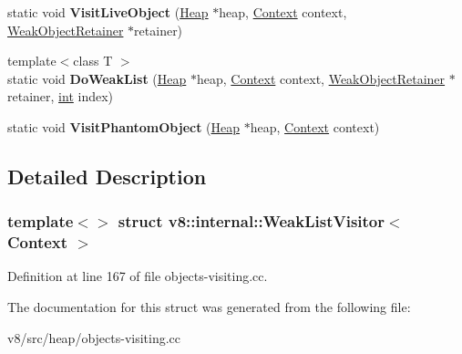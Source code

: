 \begin{DoxyCompactItemize}
static void {\bfseries Visit\+Live\+Object} (\mbox{\hyperlink{classv8_1_1internal_1_1Heap}{Heap}} $\ast$heap, \mbox{\hyperlink{classv8_1_1internal_1_1Context}{Context}} context, \mbox{\hyperlink{classv8_1_1internal_1_1WeakObjectRetainer}{Weak\+Object\+Retainer}} $\ast$retainer)
\item 
\mbox{\label{structv8_1_1internal_1_1WeakListVisitor_3_01Context_01_4_a033eff15f38049f2b457f5242b48932e}} 
{\footnotesize template$<$class T $>$ }\\static void {\bfseries Do\+Weak\+List} (\mbox{\hyperlink{classv8_1_1internal_1_1Heap}{Heap}} $\ast$heap, \mbox{\hyperlink{classv8_1_1internal_1_1Context}{Context}} context, \mbox{\hyperlink{classv8_1_1internal_1_1WeakObjectRetainer}{Weak\+Object\+Retainer}} $\ast$retainer, \mbox{\hyperlink{classint}{int}} index)
\item 
\mbox{\label{structv8_1_1internal_1_1WeakListVisitor_3_01Context_01_4_aff8cbeeeb4d41105c039dc8262631ca9}} 
static void {\bfseries Visit\+Phantom\+Object} (\mbox{\hyperlink{classv8_1_1internal_1_1Heap}{Heap}} $\ast$heap, \mbox{\hyperlink{classv8_1_1internal_1_1Context}{Context}} context)
\end{DoxyCompactItemize}


\subsection{Detailed Description}
\subsubsection*{template$<$$>$\newline
struct v8\+::internal\+::\+Weak\+List\+Visitor$<$ Context $>$}



Definition at line 167 of file objects-\/visiting.\+cc.



The documentation for this struct was generated from the following file\+:\begin{DoxyCompactItemize}
\item 
v8/src/heap/objects-\/visiting.\+cc\end{DoxyCompactItemize}
